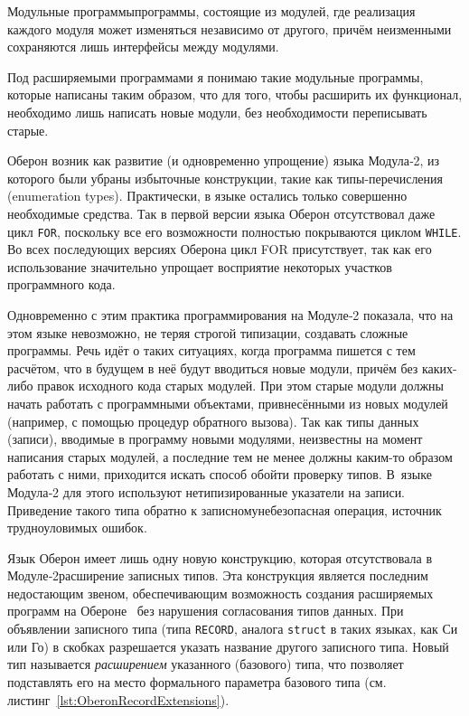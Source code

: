 \documentclass[utf8]{lgu}
\newcommand{\tire}{\unskip\nobreak\thinspace\textemdash\thinspace}
\newcommand{\code}[1]{{\normalsize\texttt{#1}}}
\begin{document}
Модульные программы\tire программы, состоящие из модулей, где реализация каждого модуля может изменяться независимо от другого, причём неизменными сохраняются лишь интерфейсы между модулями.

Под расширяемыми программами я понимаю такие модульные программы, которые написаны таким образом, что для того, чтобы расширить их функционал, необходимо лишь написать новые модули, без необходимости переписывать старые.

Оберон возник как развитие (и одновременно упрощение) языка Модула‑2, из которого были убраны избыточные конструкции, такие как типы-перечисления (enumeration types). Практически, в языке остались только совершенно необходимые средства. Так в первой версии языка Оберон отсутствовал даже цикл \code{FOR}, поскольку все его возможности полностью покрываются циклом \code{WHILE}. Во всех последующих версиях Оберона цикл FOR присутствует, так как его использование значительно упрощает восприятие некоторых участков программного кода.

Одновременно с этим практика программирования на Модуле‑2 показала, что на этом языке невозможно, не теряя строгой типизации, создавать сложные  программы. Речь идёт о таких ситуациях, когда программа пишется с тем расчётом, что в будущем в неё будут вводиться новые модули, причём без каких-либо правок исходного кода старых модулей. При этом старые модули должны начать работать с программными объектами, привнесёнными из новых модулей (например, с помощью процедур обратного вызова). Так как типы данных (записи), вводимые в программу новыми модулями, неизвестны на момент написания старых модулей, а последние тем не менее должны каким-то образом работать с ними, приходится искать способ обойти проверку типов. В~языке Модула‑2 для этого используют нетипизированные указатели на записи. Приведение такого типа обратно к записному\tire небезопасная операция, источник трудноуловимых ошибок.

Язык Оберон имеет лишь одну новую конструкцию, которая отсутствовала в Модуле‑2\tire расширение записных типов. Эта конструкция является последним недостающим звеном, обеспечивающим возможность создания расширяемых программ на Обероне~\cite{ETHOS} без нарушения согласования типов данных. При объявлении записного типа (типа \code{RECORD}, аналога \code{struct} в таких языках, как Си или Го) в скобках разрешается указать название другого записного типа. Новый тип называется \textit{расширением} указанного (базового) типа, что позволяет подставлять его на место формального параметра базового типа (см. листинг~\ref{lst:OberonRecordExtensions}).
\end{document}
